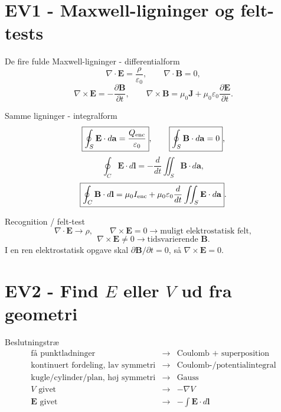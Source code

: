 \documentclass[10pt,a4paper]{article}
\begin{document}
\section*{EV1 - Maxwell-ligninger og felt-tests}
{}
\begin{casebox}{De fire fulde Maxwell-ligninger - differentialform}
\[
\boxed{\nabla\cdot\mathbf E=\frac{\rho}{\varepsilon_0}},
\qquad
\boxed{\nabla\cdot\mathbf B=0},
\]
\[
\boxed{\nabla\times\mathbf E=-\frac{\partial\mathbf B}{\partial t}},
\qquad
\boxed{\nabla\times\mathbf B=\mu_0\mathbf J+\mu_0\varepsilon_0\frac{\partial\mathbf E}{\partial t}}.
\]
\end{casebox}
\begin{casebox}{Samme ligninger - integralform}
\[
\boxed{\oint_S\mathbf E\cdot d\mathbf a=\frac{Q_{\rm enc}}{\varepsilon_0}},
\qquad
\boxed{\oint_S\mathbf B\cdot d\mathbf a=0},
\]
\[
\boxed{\oint_C\mathbf E\cdot d\mathbf l=-\frac{d}{dt}\iint_S\mathbf B\cdot d\mathbf a},
\]
\[
\boxed{\oint_C\mathbf B\cdot d\mathbf l=\mu_0I_{\rm enc}+\mu_0\varepsilon_0\frac{d}{dt}\iint_S\mathbf E\cdot d\mathbf a}.
\]
\end{casebox}
\begin{quickbox}{Recognition / felt-test}
\[
\nabla\cdot\mathbf E\to\rho,
\qquad
\nabla\times\mathbf E=0\to\text{muligt elektrostatisk felt},
\]
\[
\nabla\times\mathbf E\neq0\to\text{tidsvarierende }\mathbf B.
\]
I en ren elektrostatisk opgave skal $\partial\mathbf B/\partial t=0$, så $\nabla\times\mathbf E=0$.
\end{quickbox}

\newpage
\section*{EV2 - Find $E$ eller $V$ ud fra geometri}
{}
\begin{quickbox}{Beslutningstræ}
\[
\begin{array}{rcl}
\text{få punktladninger} &\to& \text{Coulomb + superposition}\\
\text{kontinuert fordeling, lav symmetri} &\to& \text{Coulomb-/potentialintegral}\\
\text{kugle/cylinder/plan, høj symmetri} &\to& \text{Gauss}\\
V\text{ givet} &\to& -\nabla V\\
\mathbf E\text{ givet} &\to& -\int\mathbf E\cdot d\mathbf l
\end{array}
\]
\end{quickbox}
\end{document}
